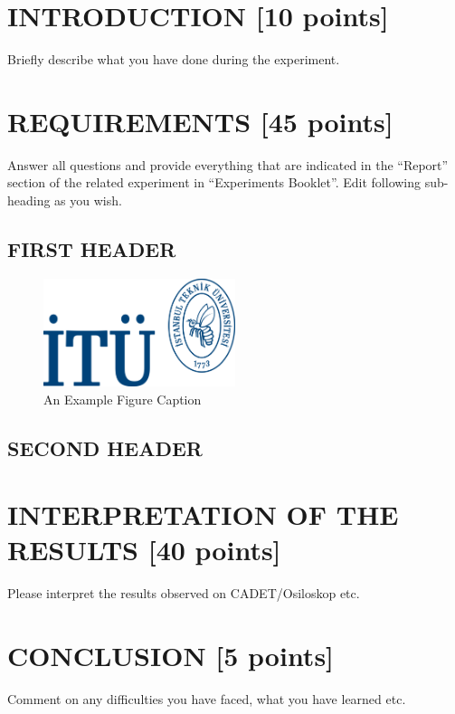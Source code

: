 \documentclass[pdftex,12pt,a4paper]{article}
\begin{document}
\setcounter{page}{1}

\section{INTRODUCTION [10 points]}

Briefly describe what you have done during the experiment.

\section{REQUIREMENTS [45 points]}
Answer all questions and provide everything that are indicated in the “Report” section of the related experiment in “Experiments Booklet”.
Edit following sub-heading as you wish.

\subsection{FIRST HEADER}
\begin{figure}[ht]
	\centering
	\includegraphics[width=0.5\textwidth]{logo.png}	
	\caption{An Example Figure Caption\cite{ref1}}
	\label{fig1}
\end{figure}

\subsection{SECOND HEADER}

\section{INTERPRETATION OF THE RESULTS [40 points]}
Please interpret the results observed on CADET/Osiloskop etc.
\section{CONCLUSION [5 points]}
Comment on any difficulties you have faced, what you have learned etc.

\newpage
{}



\end{document}

